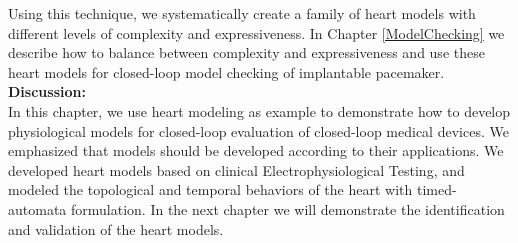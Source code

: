 Using this technique, we systematically create a family of heart models with different levels of complexity and expressiveness. In Chapter \ref{ModelChecking} we describe how to balance between complexity and expressiveness and use these heart models for closed-loop model checking of implantable pacemaker.
\noindent\textbf{Discussion:}\\
In this chapter, we use heart modeling as example to demonstrate how to develop physiological models for closed-loop evaluation of closed-loop medical devices. We emphasized that models should be developed according to their applications. We developed heart models based on clinical Electrophysiological Testing, and modeled the topological and temporal behaviors of the heart with timed-automata formulation. In the next chapter we will demonstrate the identification and validation of the heart models.


